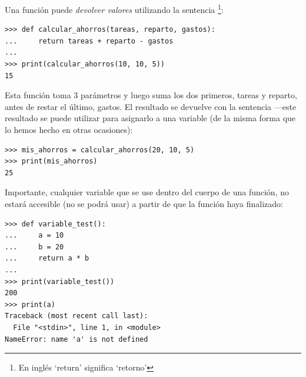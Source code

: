 \noindent
Una función puede \emph{devolver valores} utilizando la sentencia \footnote{En inglés `return' significa `retorno'}:

\begin{listing}
\begin{verbatim}
>>> def calcular_ahorros(tareas, reparto, gastos):
...     return tareas + reparto - gastos
...
>>> print(calcular_ahorros(10, 10, 5))
15
\end{verbatim}
\end{listing}

Esta función toma 3 parámetros y luego suma los dos primeros, tareas y reparto, antes de restar el último, gastos.  El resultado se devuelve con la sentencia ---este resultado se puede utilizar para asignarlo a una variable (de la misma forma que lo hemos hecho en otras ocasiones): 

\begin{listing}
\begin{verbatim}
>>> mis_ahorros = calcular_ahorros(20, 10, 5)
>>> print(mis_ahorros)
25
\end{verbatim}
\end{listing}

\noindent
Importante, cualquier variable que se use dentro del cuerpo de una función, no estará accesible (no se podrá usar) a partir de que la función haya finalizado:

\begin{listing}
\begin{verbatim}
>>> def variable_test():
...     a = 10
...     b = 20
...     return a * b
...
>>> print(variable_test())
200
>>> print(a)
Traceback (most recent call last):
  File "<stdin>", line 1, in <module>
NameError: name 'a' is not defined
\end{verbatim}
\end{listing} 


